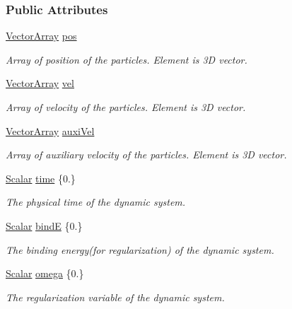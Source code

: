 \subsubsection*{Public Attributes}
\begin{DoxyCompactItemize}
\item 
\mbox{\hyperlink{class_g_a_r_a5818e17eb203504af6e10f38fc38d378}{Vector\+Array}} \mbox{\hyperlink{class_g_a_r_aec6b3fdb2c4dd7bdae27c0b41fbf6dda}{pos}}
\begin{DoxyCompactList}\small\item\em Array of position of the particles. Element is 3D vector. \end{DoxyCompactList}\item 
\mbox{\hyperlink{class_g_a_r_a5818e17eb203504af6e10f38fc38d378}{Vector\+Array}} \mbox{\hyperlink{class_g_a_r_a9619f6250eb37cb006bd508591f01997}{vel}}
\begin{DoxyCompactList}\small\item\em Array of velocity of the particles. Element is 3D vector. \end{DoxyCompactList}\item 
\mbox{\hyperlink{class_g_a_r_a5818e17eb203504af6e10f38fc38d378}{Vector\+Array}} \mbox{\hyperlink{class_g_a_r_ade7c1f936a5f23a0ded2d02b2cc750e6}{auxi\+Vel}}
\begin{DoxyCompactList}\small\item\em Array of auxiliary velocity of the particles. Element is 3D vector. \end{DoxyCompactList}\item 
\mbox{\hyperlink{class_g_a_r_a2ae44eda8e28d5dd26cf707dcda69314}{Scalar}} \mbox{\hyperlink{class_g_a_r_afaec5fb6242a3e5ae5cd368832cd1bb8}{time}} \{0.\}
\begin{DoxyCompactList}\small\item\em The physical time of the dynamic system. \end{DoxyCompactList}\item 
\mbox{\hyperlink{class_g_a_r_a2ae44eda8e28d5dd26cf707dcda69314}{Scalar}} \mbox{\hyperlink{class_g_a_r_a10f49216d9cacb2b21bd053a2ddb997c}{bindE}} \{0.\}
\begin{DoxyCompactList}\small\item\em The binding energy(for regularization) of the dynamic system. \end{DoxyCompactList}\item 
\mbox{\hyperlink{class_g_a_r_a2ae44eda8e28d5dd26cf707dcda69314}{Scalar}} \mbox{\hyperlink{class_g_a_r_a702f19b87d8754ac66914985d7c8229e}{omega}} \{0.\}
\begin{DoxyCompactList}\small\item\em The regularization variable of the dynamic system. \end{DoxyCompactList}\end{DoxyCompactItemize}


